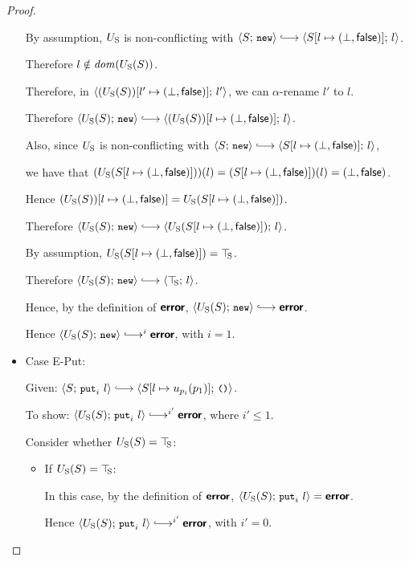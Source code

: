 \begin{proof}
\begin{itemize}
    By assumption, $U_{\mathrm{S}}$ is non-conflicting with $\config{S}{\NEW}
    \parstepsto \config{\extS{S}{l}{\bot}{\frozenfalse}}{l}$.

    Therefore $l \notin \mathit{dom}(U_{\mathrm{S}}(S))$.

    Therefore, in
    $\langle (U_{\mathrm{S}}(S))[l' \mapsto (\bot, \textsf{false})];\, l' \rangle$, we
    can $\alpha$-rename $l'$ to $l$.

    Therefore $\config{\Ustore(S)}{\NEW} \parstepsto
    \config{\extS{(\Ustore(S))}{l}{\bot}{\frozenfalse}}{l}$.

    Also, since $U_{\mathrm{S}}$ is non-conflicting with $\config{S}{\NEW}
    \parstepsto \config{\extS{S}{l}{\bot}{\frozenfalse}}{l}$,

    we have that $(U_{\mathrm{S}}(S[l \mapsto (\bot, \textsf{false})]))(l) =
    (S[l \mapsto (\bot, \textsf{false})])(l) =
    (\bot, \textsf{false})$.

    Hence $(U_{\mathrm{S}}(S))[l \mapsto (\bot, \textsf{false})] =
    U_{\mathrm{S}}(S[l \mapsto (\bot, \textsf{false})])$.

    Therefore $\config{\Ustore(S)}{\NEW} \parstepsto
    \config{\Ustore(\extS{S}{l}{\bot}{\frozenfalse})}{l}$.

    By assumption, $U_{\mathrm{S}}(S[l \mapsto (\bot, \textsf{false})]) = \top\hspace{-0.85mm}_{\mathrm{S}}$.

    Therefore $\config{\Ustore(S)}{\NEW} \parstepsto \config{\topS}{l}$.

    Hence, by the definition of $\textbf{\textsf{error}}$, $\config{\Ustore(S)}{\NEW}
    \parstepsto \error$.

    Hence $\config{\Ustore(S)}{\NEW} \parstepsto^i \error$, with $i = 1$.

  \item Case {\sc E-Put}:

    Given: $\config{S}{\putiexp{l}} \parstepsto
    \config{\extSRaw{S}{l}{u_{p_i}(p_1)}}{\unit}$.

    To show: $\config{\Ustore(S)}{\putiexp{l}} \parstepsto^{i'} \error$,
    where $i' \leq 1$.

    Consider whether $U_{\mathrm{S}}(S) = \top\hspace{-0.85mm}_{\mathrm{S}}$:
    \begin{itemize}

    \item If $U_{\mathrm{S}}(S) = \top\hspace{-0.85mm}_{\mathrm{S}}$:

      In this case, by the definition of $\textbf{\textsf{error}}$,
      $\langle U_{\mathrm{S}}(S);\, \mbox{\small{\texttt{put}}}_i~l \rangle = \textbf{\textsf{error}}$.

      Hence $\config{\Ustore(S)}{\putiexp{l}} \parstepsto^{i'} \error$,
      with $i' = 0$.


\end{itemize}
\end{itemize}
\end{proof}
